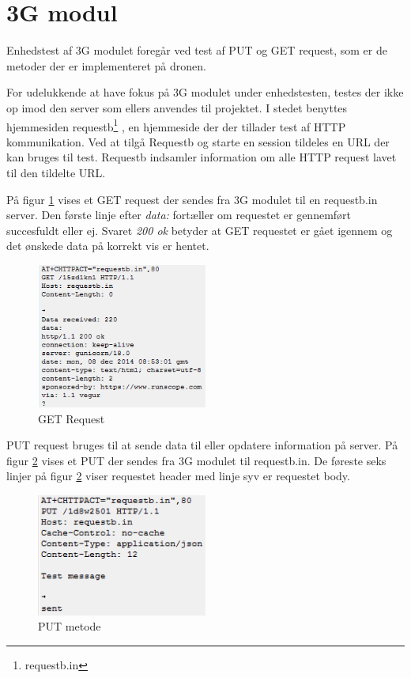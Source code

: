 \section{3G modul}

Enhedstest af 3G modulet foregår ved test af PUT og GET request, som er de metoder der er implementeret på dronen.

For udelukkende at have fokus på 3G modulet under enhedstesten, testes der ikke op imod den server som ellers anvendes til projektet. I stedet benyttes hjemmesiden requestb\footnote{requestb.in} , en hjemmeside der der tillader test af HTTP kommunikation. Ved at tilgå Requestb og starte en session tildeles en URL der kan bruges til test. Requestb indsamler information om alle HTTP request lavet til den tildelte URL. 

På figur \ref{fig:get_req} vises et GET request der sendes fra 3G modulet til en requestb.in server. Den første linje efter \textit{data:} fortæller om requestet er gennemført succesfuldt eller ej. Svaret \textit{200 ok} betyder at GET requestet er gået igennem og det ønskede data på korrekt vis er hentet. 

\vspace{0.3cm}

\begin{figure}[H]
\centering
\includegraphics[width=0.5\textwidth]{Billeder/Test/get_requestbin.png}
\caption{GET Request}
\label{fig:get_req}
\end{figure}

\newpage

PUT request bruges til at sende data til eller opdatere information på server. 
På figur \ref{fig:putrequest_module} vises et PUT der sendes fra 3G modulet til requestb.in. De føreste seks linjer på figur \ref{fig:putrequest_module} viser requestet header med linje syv er requestet body. 

\begin{figure}[H]
\centering
\includegraphics[width=0.5\textwidth]{Billeder/Test/putrequest_module.png}
\caption{PUT metode}
\label{fig:putrequest_module}
\end{figure}

